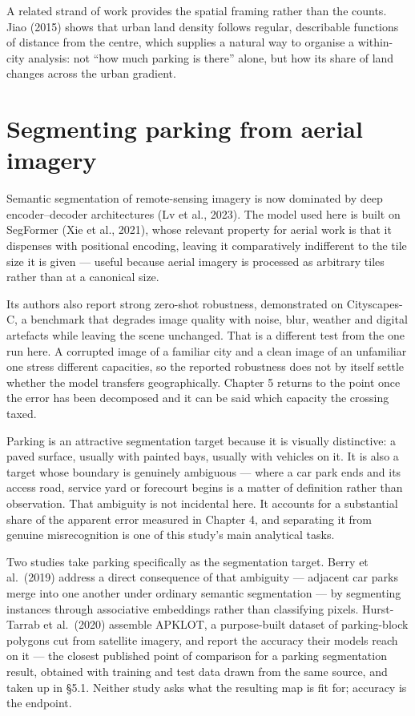 A related strand of work provides the spatial framing rather than the counts. Jiao (2015) shows that urban land density follows regular, describable functions of distance from the centre, which supplies a natural way to organise a within-city analysis: not ``how much parking is there'' alone, but how its share of land changes across the urban gradient.

\hypertarget{segmenting-parking-from-aerial-imagery}{%
\section{Segmenting parking from aerial imagery}\label{segmenting-parking-from-aerial-imagery}}

Semantic segmentation of remote-sensing imagery is now dominated by deep encoder--decoder architectures (Lv et al., 2023). The model used here is built on SegFormer (Xie et al., 2021), whose relevant property for aerial work is that it dispenses with positional encoding, leaving it comparatively indifferent to the tile size it is given --- useful because aerial imagery is processed as arbitrary tiles rather than at a canonical size.

Its authors also report strong zero-shot robustness, demonstrated on Cityscapes-C, a benchmark that degrades image quality with noise, blur, weather and digital artefacts while leaving the scene unchanged. That is a different test from the one run here. A corrupted image of a familiar city and a clean image of an unfamiliar one stress different capacities, so the reported robustness does not by itself settle whether the model transfers geographically. Chapter 5 returns to the point once the error has been decomposed and it can be said which capacity the crossing taxed.

Parking is an attractive segmentation target because it is visually distinctive: a paved surface, usually with painted bays, usually with vehicles on it. It is also a target whose boundary is genuinely ambiguous --- where a car park ends and its access road, service yard or forecourt begins is a matter of definition rather than observation. That ambiguity is not incidental here. It accounts for a substantial share of the apparent error measured in Chapter 4, and separating it from genuine misrecognition is one of this study's main analytical tasks.

Two studies take parking specifically as the segmentation target. Berry et al.~(2019) address a direct consequence of that ambiguity --- adjacent car parks merge into one another under ordinary semantic segmentation --- by segmenting instances through associative embeddings rather than classifying pixels. Hurst-Tarrab et al.~(2020) assemble APKLOT, a purpose-built dataset of parking-block polygons cut from satellite imagery, and report the accuracy their models reach on it --- the closest published point of comparison for a parking segmentation result, obtained with training and test data drawn from the same source, and taken up in §5.1. Neither study asks what the resulting map is fit for; accuracy is the endpoint.

